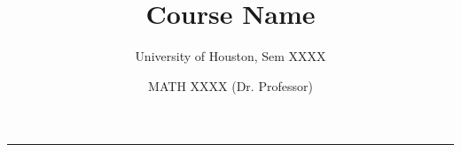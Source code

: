 \documentclass[letterpaper, 10pt]{article}
\title{Course Name}
\author{University of Houston, Sem XXXX}
\date{MATH XXXX (Dr. Professor)}
\theoremstyle{theostyle}
\begin{document}
\maketitle
\rule{0.9\textwidth}{0.5pt}

\tableofcontents
\newpage
\end{document}
